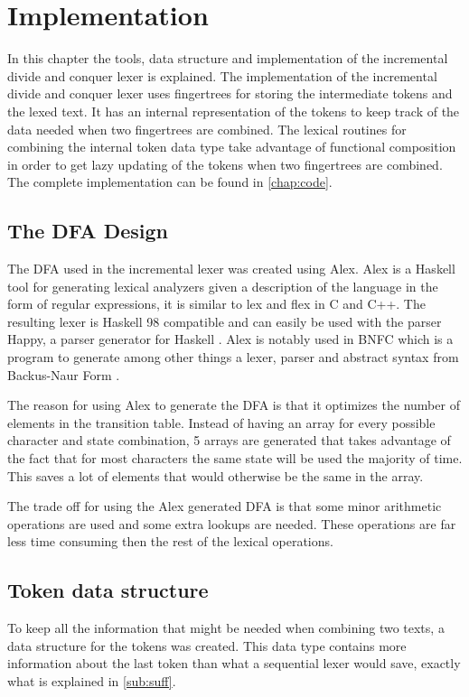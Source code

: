 \chapter{Implementation}\label{chap:imp}
In this chapter the tools, data structure and implementation of the incremental
divide and conquer lexer is explained. The implementation of the incremental
divide and conquer lexer uses fingertrees for storing the intermediate tokens
and the lexed text. It has an internal representation of the tokens to keep
track of the data needed when two fingertrees are combined. The lexical routines
for combining the internal token data type take advantage of functional
composition in order to get lazy updating of the tokens when two fingertrees are
combined. The complete implementation can be found in \cref{chap:code}.

\section{The DFA Design}
The DFA used in the incremental lexer was created using Alex. Alex is a Haskell
tool for generating lexical analyzers given a
description of the language in the form of regular expressions, it is similar to
lex and flex in C and C++. The resulting lexer is Haskell 98 compatible and can
easily be used with the parser Happy, a parser generator for Haskell \cite{alex}.
Alex is notably used in BNFC which is a program to generate among other things a
lexer, parser and abstract syntax from Backus-Naur Form \cite{bnfc}.

The reason for using Alex to generate the DFA is that it optimizes the number of
elements in the transition table. Instead of
having an array for every possible character and state combination, 5 arrays are
generated that takes advantage of the fact that for most characters the same
state will be used the majority of time. This saves a lot of elements that
would otherwise be the same in the array.

\newpage

The trade off for using the Alex generated DFA is that some minor arithmetic
operations are used and some extra lookups are needed. These operations
are far less time consuming then the rest of the lexical operations.

\section{Token data structure}
To keep all the information that might be needed when combining two texts, a data
structure for the tokens was created. This data type contains more information
about the last token than what a sequential lexer would save, exactly what is
explained in \cref{sub:suff}.

